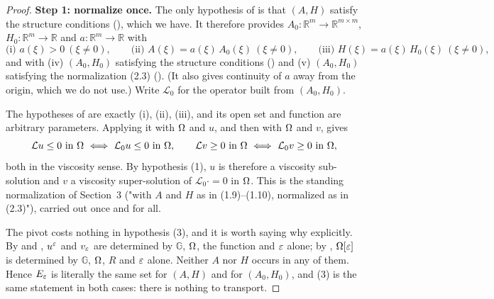\begin{proof}
\medskip\noindent\textbf{Step 1: normalize once.} The only hypothesis of
 is that $(A,H)$ satisfy the structure conditions
(), which we have. It therefore provides
$A_0:\mathbb R^{m}\to\mathbb R^{m\times m}$, $H_0:\mathbb R^{m}\to\mathbb R$ and
$a:\mathbb R^{m}\to\mathbb R$ with
\[
 \text{(i) } a(\xi)>0 \ (\xi\ne0),\qquad
 \text{(ii) } A(\xi)=a(\xi)\,A_0(\xi)\ (\xi\ne0),\qquad
 \text{(iii) } H(\xi)=a(\xi)\,H_0(\xi)\ (\xi\ne0),
\]
and with (iv) $(A_0,H_0)$ satisfying the structure conditions
() and (v) $(A_0,H_0)$ satisfying the normalization (2.3)
(). (It also gives continuity of $a$ away from the origin, which we do
not use.) Write $\mathcal L_0$ for the operator built from $(A_0,H_0)$.

The hypotheses of  are exactly (i), (ii), (iii),
and its open set and function are arbitrary parameters. Applying it with $\Omega$ and $u$, and
then with $\Omega$ and $v$, gives
\[
 \mathcal Lu\le0\ \text{in}\ \Om\ \Longleftrightarrow\ \mathcal L_0u\le0\ \text{in}\ \Om,
 \qquad
 \mathcal Lv\ge0\ \text{in}\ \Om\ \Longleftrightarrow\ \mathcal L_0v\ge0\ \text{in}\ \Om,
\]
both in the viscosity sense. By hypothesis (1), $u$ is therefore a viscosity sub-solution and
$v$ a viscosity super-solution of $\mathcal L_0\cdot=0$ in $\Omega$. This is the standing
normalization of Section~3 ("with $A$ and $H$ as in (1.9)--(1.10), normalized as in
(2.3)"), carried out once and for all.

The pivot costs nothing in hypothesis (3), and it is worth saying why explicitly. By
 and , $u^{\varepsilon}$ and $v_{\varepsilon}$ are determined by
$\mathbb G$, $\Omega$, the function and $\varepsilon$ alone; by , $\Omega[\varepsilon]$ is
determined by $\mathbb G$, $\Omega$, $R$ and $\varepsilon$ alone. Neither $A$ nor $H$ occurs in any of
them. Hence $E_\varepsilon$ is literally the same set for $(A,H)$ and for $(A_0,H_0)$, and (3) is
the same statement in both cases: there is nothing to transport.


\end{proof}
